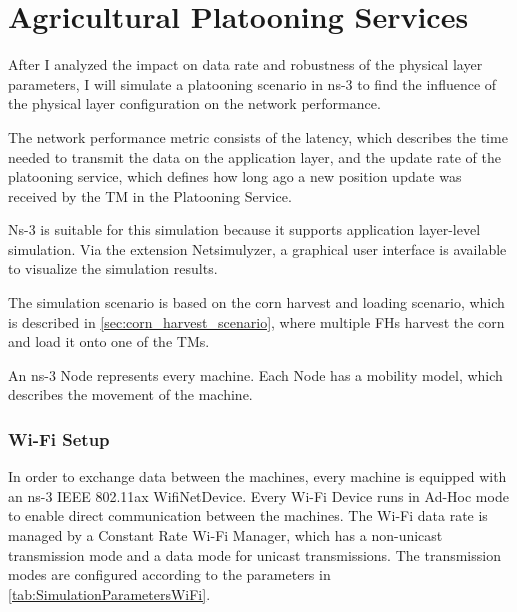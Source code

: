 \section{Agricultural Platooning Services}

After I analyzed the impact on data rate and robustness of the physical layer parameters, I will simulate a platooning scenario in ns-3 to find the influence of the physical layer configuration on the network performance.

The network performance metric consists of the latency, which describes the time needed to transmit the data
on the application layer, and the update rate of the platooning service, which defines how long ago a new position update
was received by the \ac{TM} in the Platooning Service.

Ns-3 is suitable for this simulation because it supports application layer-level simulation.
Via the extension Netsimulyzer, a graphical user interface is available to visualize the simulation results.

The simulation scenario is based on the corn harvest and loading scenario, which is described in \autoref{sec:corn_harvest_scenario}, where
multiple \acp{FH} harvest the corn and load it onto one of the \acp{TM}.

An ns-3 Node represents every machine.
Each Node has a mobility model, which describes the movement of the machine.

\subsubsection*{Wi-Fi Setup}
In order to exchange data between the machines, every machine is equipped with an  ns-3 IEEE 802.11ax WifiNetDevice.
Every Wi-Fi Device runs in Ad-Hoc mode to enable direct communication
between the machines.
The Wi-Fi data rate is managed by a Constant Rate Wi-Fi Manager, which has a non-unicast
transmission mode and a data mode for unicast transmissions.
The transmission modes are configured according
to the parameters in \autoref{tab:SimulationParametersWiFi}.

